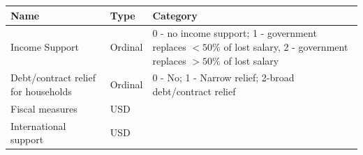 \documentclass[
  6pt,
]{article}
\begin{document}
\begin{longtable}[]{@{}lll@{}}
\toprule
\begin{minipage}[b]{0.18\columnwidth}\raggedright
\textbf{Name}\strut
\end{minipage} & \begin{minipage}[b]{0.2\columnwidth}\raggedright
\textbf{Type}\strut
\end{minipage} & \begin{minipage}[b]{0.69\columnwidth}\raggedright
\hspace{3mm}\textbf{Category}\strut
\end{minipage}\tabularnewline
\midrule
\endhead
\begin{minipage}[t]{0.18\columnwidth}\raggedright
Income Support\strut
\end{minipage} & \begin{minipage}[t]{0.04\columnwidth}\raggedright
Ordinal\strut
\end{minipage} & \begin{minipage}[t]{0.69\columnwidth}\raggedright
0 - no income support; 1 - government replaces $<50\%$ of lost salary, 2 - \hspace{5mm} government replaces $>50\%$ of lost
salary\strut
\end{minipage}\tabularnewline
\begin{minipage}[t]{0.18\columnwidth}\raggedright
Debt/contract relief for households\strut
\end{minipage} & \begin{minipage}[t]{0.04\columnwidth}\raggedright
Ordinal \hspace{2mm}\strut
\end{minipage} & \begin{minipage}[t]{0.69\columnwidth}\raggedright
0 - No; 1 - Narrow relief; 2-broad debt/contract relief\strut
\end{minipage}\tabularnewline
\begin{minipage}[t]{0.18\columnwidth}\raggedright
Fiscal measures\strut
\end{minipage} & \begin{minipage}[t]{0.04\columnwidth}\raggedright
USD\hspace{2mm}\strut
\end{minipage} & \begin{minipage}[t]{0.69\columnwidth}\raggedright
\strut
\end{minipage}\tabularnewline
\begin{minipage}[t]{0.18\columnwidth}\raggedright
International support\strut
\end{minipage} & \begin{minipage}[t]{0.04\columnwidth}\raggedright
USD\hspace{2mm}\strut
\end{minipage} & \begin{minipage}[t]{0.69\columnwidth}\raggedright
\strut
\end{minipage}\tabularnewline
\bottomrule
\end{longtable}
\end{document}
